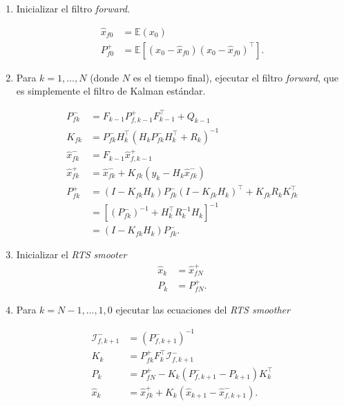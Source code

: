 \begin{enumerate}
    \item Inicializar el filtro \textit{forward}.
    
    \begin{equation}
    \begin{aligned}
    \hat{x}_{f0} &= \mathbb{E}(x_0) \\
    P^{+}_{f0} &= \mathbb{E}\left[(x_0 - \hat{x}_{f0})(x_0 - \hat{x}_{f0})^{\top}\right]. 
    \end{aligned}
    \end{equation}
    
    \item Para \(k = 1, \dots, N\) (donde \(N\) es el tiempo final), ejecutar el filtro \textit{forward}, que es simplemente el filtro de Kalman estándar. 
    
    \begin{equation}\label{eq:fordward}
    \begin{aligned}
    P^{-}_{fk} &= F_{k-1}P^{+}_{f,k-1}F_{k-1}^{\top} + Q_{k-1} \\ 
    K_{fk} &= P^{-}_{fk} H_k^{\top} (H_k P^{-}_{fk}H_k^{\top} + R_k)^{-1}  \\
    \hat{x}^{-}_{fk} &= F_{k-1}\hat{x}^{+}_{f,k-1}\\
    \hat{x}^{+}_{fk} &= \hat{x}^{-}_{fk} + K_{fk} \left(y_k - H_k \hat{x}^{-}_{fk} \right)\\ 
    P^{+}_{fk} &= (I - K_{fk}H_k) P^{-}_{fk} (I-K_{fk}H_k)^{\top} + K_{fk}R_{k}K_{fk}^{\top} \\
    &= \left[ (P^{-}_{fk})^{-1} + H_k^{\top} R_{k}^{-1}H_k\right]^{-1} \\ 
    &= (I - K_{fk}H_k)P^{-}_{fk}.
    \end{aligned}
    \end{equation}
    
    \item Inicializar el \textit{RTS smooter} 
    \begin{equation}
    \begin{aligned}
    \hat{x}_{k} &= \hat{x}^{+}_{fN} \\
    P_k &= P^{+}_{fN}.
    \end{aligned}
    \end{equation}
    
    \item Para \(k = N-1, \dots, 1, 0\) ejecutar las ecuaciones del \textit{RTS smoother} 
    
    \begin{equation}\label{eq:backward}
    \begin{aligned}
    \mathcal{I}^{-}_{f, k+1} &= \left( P^{-}_{f, k+1}\right)^{-1} \\
    K_k &= P^{+}_{fk} F_{k}^{\top} \mathcal{I}^{-}_{f, k+1} \\
    P_k &= P^{+}_{fN} - K_k (P^{-}_{f, k+1} - P_{k+1})K_k^{\top} \\ 
    \hat{x}_k &= \hat{x}^{+}_{fk} + K_k(\hat{x}_{k+1} - \hat{x}^{-}_{f,k+1}).
    \end{aligned}
    \end{equation}
\end{enumerate}
